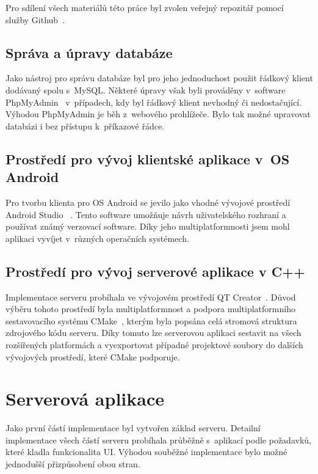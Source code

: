 \documentclass[thesis=B,czech]{FITthesis}[2013/10/20]
\begin{document}
Pro sdílení všech materiálů této práce byl zvolen veřejný repozitář pomocí~\cite{repo} služby Github~\cite{github}.

\subsection{Správa a úpravy databáze}

Jako nástroj pro správu databáze byl pro jeho jednoduchost použit řádkový klient dodávaný spolu s~MySQL. Některé úpravy však byli prováděny v~software PhpMyAdmin~\cite{phpmyadmin} v~případech, kdy byl řádkový klient nevhodný či nedostačující. Výhodou PhpMyAdmin je běh z~webového prohlížeče. Bylo tak možné upravovat databázi i bez přístupu k~příkazové řádce.

\subsection{Prostředí pro vývoj klientské aplikace v~OS Android}

Pro tvorbu klienta pro OS Android se jevilo jako vhodné vývojové prostředí Android Studio ~\cite{android_studio}. Tento software umožňuje návrh uživatelského rozhraní a používat známý verzovací software. Díky jeho multiplatformnosti jsem mohl aplikaci vyvíjet v~různých operačních systémech.

\subsection{Prostředí pro vývoj serverové aplikace v C++}

Implementace serveru probíhala ve vývojovém prostředí QT Creator~\cite{qtcreator}. Důvod výběru tohoto prostředí byla multiplatformnost a podpora multiplatformního sestavovacího systému CMake~\cite{cmake}, kterým byla popsána celá stromová struktura zdrojového kódu serveru. Díky tomuto lze serverovou aplikaci sestavit na všech rozšířených platformách a vyexportovat případné projektové soubory do dalších vývojových prostředí, které CMake podporuje.

\section{Serverová aplikace}

Jako první částí implementace byl vytvořen základ serveru. Detailní implementace všech částí serveru probíhala průběžně s~aplikací podle požadavků, které kladla funkcionalita UI. Výhodou souběžné implementace bylo možné jednodušší přizpůsobení obou stran.
\end{document}
